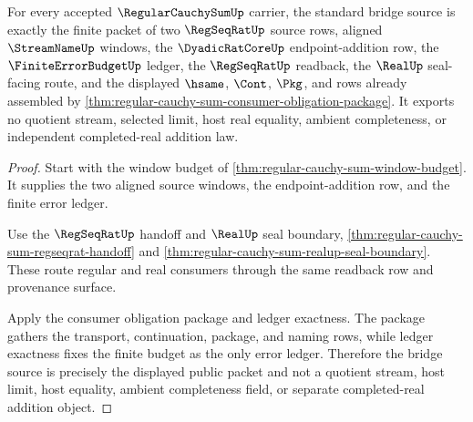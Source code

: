 \begin{theorem}
\label{thm:regular-cauchy-sum-standard-bridge-source-packet}
For every accepted $\RegularCauchySumUp$ carrier, the standard bridge source is exactly the finite packet of two $\RegSeqRatUp$ source rows, aligned $\StreamNameUp$ windows, the $\DyadicRatCoreUp$ endpoint-addition row, the $\FiniteErrorBudgetUp$ ledger, the $\RegSeqRatUp$ readback, the $\RealUp$ seal-facing route, and the displayed $\hsame$, $\Cont$, $\Pkg$, and \NameCert{} rows already assembled by \autoref{thm:regular-cauchy-sum-consumer-obligation-package}. It exports no quotient stream, selected limit, host real equality, ambient completeness, or independent completed-real addition law.
\end{theorem}
\begin{proof}
Start with the window budget of \autoref{thm:regular-cauchy-sum-window-budget}. It supplies the two aligned source windows, the endpoint-addition row, and the finite error ledger.

Use the $\RegSeqRatUp$ handoff and $\RealUp$ seal boundary, \autoref{thm:regular-cauchy-sum-regseqrat-handoff} and \autoref{thm:regular-cauchy-sum-realup-seal-boundary}. These route regular and real consumers through the same readback row and provenance surface.

Apply the consumer obligation package and ledger exactness. The package gathers the transport, continuation, package, and naming rows, while ledger exactness fixes the finite budget as the only error ledger. Therefore the bridge source is precisely the displayed public packet and not a quotient stream, host limit, host equality, ambient completeness field, or separate completed-real addition object.
\end{proof}

